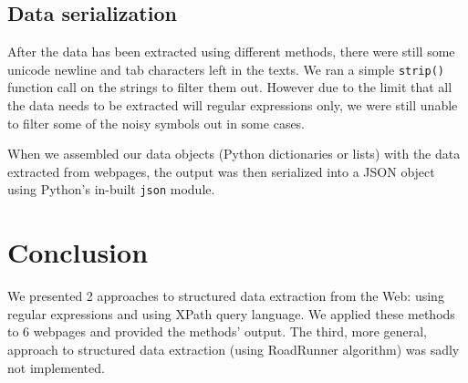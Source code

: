 \documentclass[9pt]{IEEEtran}
\begin{document}
\subsection{Data serialization}
After the data has been extracted using different methods, there were still some unicode newline and tab characters left in the texts. We ran a simple \texttt{strip()} function call on the strings to filter them out.
However due to the limit that all the data needs to be extracted will regular expressions only, we were still unable to filter some of the noisy symbols out in some cases.

When we assembled our data objects (Python dictionaries or lists) with the data extracted from webpages, the output was then serialized into a JSON object using Python's in-built \verb/json/ module.

\section{Conclusion}
\label{section:conclusion}
We presented 2 approaches to structured data extraction from the Web: using regular expressions and using XPath query language.
We applied these methods to 6 webpages and provided the methods' output.
The third, more general, approach to structured data extraction (using RoadRunner algorithm) was sadly not implemented.



\end{document}
